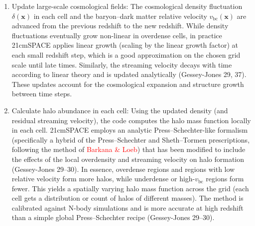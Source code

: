 \documentclass[floats,floatfix,showpacs,amssymb,prd,superscriptaddress,nofootinbib]{revtex4-2} %
\newcommand{\red}{\textcolor{red}}
\begin{document}
\begin{enumerate}
    \item Update large-scale cosmological fields: The cosmological density fluctuation $\delta(\mathbf{x})$ in each cell and the baryon–dark matter relative velocity $v_{\text{bc}}(\mathbf{x})$ are advanced from the previous redshift to the new redshift. While density fluctuations eventually grow non-linear in overdense cells, in practice 21cmSPACE applies linear growth (scaling by the linear growth factor) at each small redshift step, which is a good approximation on the chosen grid scale until late times. Similarly, the streaming velocity decays with time according to linear theory and is updated analytically (Gessey-Jones 29, 37). These updates account for the cosmological expansion and structure growth between time steps.

    \item Calculate halo abundance in each cell: Using the updated density (and residual streaming velocity), the code computes the halo mass function locally in each cell. 21cmSPACE employs an analytic Press–Schechter-like formalism (specifically a hybrid of the Press–Schechter and Sheth–Tormen prescriptions, following the method of \red{Barkana \& Loeb}) that has been modified to include the effects of the local overdensity and streaming velocity on halo formation (Gessey-Jones 29–30). In essence, overdense regions and regions with low relative velocity form more halos, while underdense or high-$v_{\text{bc}}$ regions form fewer. This yields a spatially varying halo mass function across the grid (each cell gets a distribution or count of halos of different masses). The method is calibrated against N-body simulations and is more accurate at high redshift than a simple global Press–Schechter recipe (Gessey-Jones 29–30).


\end{enumerate}
\end{document}
